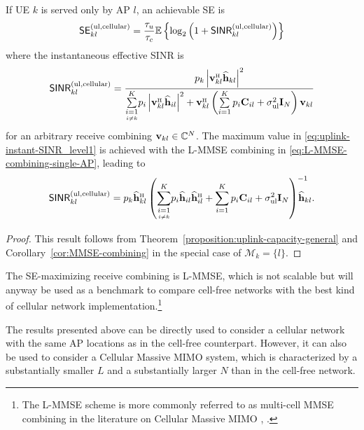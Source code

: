 \begin{corollary} \label{theorem:uplink-capacity-general-level1}
If UE $k$ is served only by AP $l$, an achievable SE is
	\begin{equation} \label{eq:uplink-rate-expression-general-level1}
	\mathsf{SE}_{kl}^{({\rm ul},\textrm{cellular})} = \frac{\tau_u}{\tau_c} \mathbb{E} \left\{ \log_2  \left( 1 + \mathsf{SINR}_{kl}^{({\rm ul},\textrm{cellular})}  \right) \right\}
	\end{equation}
	where the instantaneous effective SINR is
	\begin{equation} \label{eq:uplink-instant-SINR_level1}
	\mathacr{SINR}_{kl}^{({\rm ul},\cell)}=\frac{ p_{k} \left|  \vect{v}_{kl}^{\Htran} \widehat{\vect{h}}_{kl} \right|^2  }{ 
		\condSum{i=1}{i \neq k}{K} p_{i} \left | \vect{v}_{kl}^{\Htran} \widehat{\vect{h}}_{il} \right|^2
		+ \vect{v}_{kl}^{\Htran}  \left( \sum\limits_{i=1}^{K} p_{i} \vect{C}_{il} + \sigmaUL  \vect{I}_{N} \right)  \vect{v}_{kl} 
	}
	\end{equation}
for an arbitrary receive combining $\mathbf{v}_{kl} \in \mathbb{C}^N$. 
	The maximum value in \eqref{eq:uplink-instant-SINR_level1} is achieved with the L-MMSE combining in \eqref{eq:L-MMSE-combining-single-AP}, leading to 
	\begin{align}
	\mathacr{SINR}_{kl}^{({\rm ul},\cell)} =  p_{k}  \widehat{\vect{h}}_{kl}^{\Htran} \left( \condSum{i=1}{i \neq k}{K} p_{i}  \widehat{\vect{h}}_{il} \widehat{\vect{h}}_{il}^{\Htran} + \sum\limits_{i=1}^{K} p_{i} \vect{C}_{il} + \sigmaUL  \vect{I}_{N} \right)^{-1} \!\!\!\!\! \!\!\widehat{\vect{h}}_{kl}. \label{eq:uplink-maximized-SINR-level1}
	\end{align}
\end{corollary}
\begin{proof}
This result follows from Theorem~\ref{proposition:uplink-capacity-general} and Corollary~\ref{cor:MMSE-combining} in the special case of $\mathcal{M}_k=\{l \}$.
\end{proof}



The SE-maximizing receive combining is L-MMSE, which is not scalable but will anyway be used as a benchmark to compare cell-free networks with the best kind of cellular network implementation.\footnote{The L-MMSE scheme is more commonly referred to as multi-cell MMSE combining in the literature on Cellular Massive MIMO \cite{BjornsonHS17}, \cite{massivemimobook}.}

The results presented above can be directly used to consider a cellular network with the same AP locations as in the cell-free counterpart. However, it can also be used to consider a Cellular Massive MIMO system, which is characterized by a substantially smaller $L$ and a substantially larger $N$ than in the cell-free network. 

